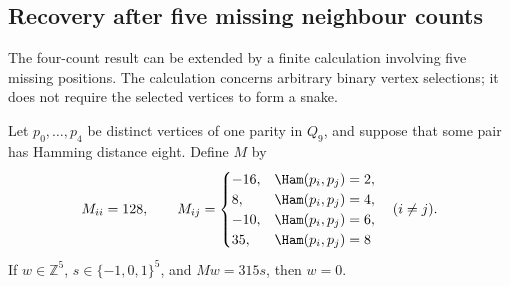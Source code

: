 \subsection{Recovery after five missing neighbour counts}
\label{sec:five-erasure240}
The four-count result can be extended by a finite calculation involving
five missing positions. The calculation concerns arbitrary binary vertex
selections; it does not require the selected vertices to form a snake.

\begin{lemma}\label{lem:five-matrix240}
Let $p_0,\ldots,p_4$ be distinct vertices of one parity in $Q_9$,
and suppose that some pair has Hamming distance eight. Define $M$ by
\[
M_{ii}=128,\qquad
M_{ij}=\begin{cases}
-16,&\Ham(p_i,p_j)=2,\\
8,&\Ham(p_i,p_j)=4,\\
-10,&\Ham(p_i,p_j)=6,\\
35,&\Ham(p_i,p_j)=8
\end{cases}\quad(i\ne j).
\]
If $w\in\mathbb Z^5$, $s\in\{-1,0,1\}^5$, and $Mw=315s$, then $w=0$.
\end{lemma}
